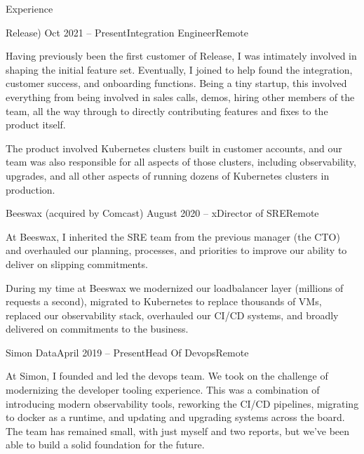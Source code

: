 \documentclass{resume} %
\begin{document}

\begin{rSection}{Experience}

\begin{rSubsection}{Release) }{Oct 2021 -- Present}{Integration Engineer}{Remote}

\item[]  Having previously been the first customer of Release, I was intimately involved in shaping
the initial feature set.  Eventually, I joined to help found the integration, customer success, and onboarding functions.  Being a tiny startup, this involved everything from
being involved in sales calls, demos, hiring other members of the team, all the way through to
directly contributing features and fixes to the product itself.

The product involved Kubernetes clusters built in customer accounts, and our team was also
responsible for all aspects of those clusters, including observability, upgrades, and all other aspects of
running dozens of Kubernetes clusters in production.

\end{rSubsection}


\begin{rSubsection}{Beeswax (acquired by Comcast) }{August 2020 -- x}{Director of SRE}{Remote}

\item[]  At Beeswax, I inherited the SRE team from the previous manager (the CTO) and overhauled our planning, processes, and priorities to improve our ability to deliver on slipping commitments.

During my time at Beeswax we modernized our loadbalancer layer (millions of requests a second), migrated to Kubernetes to replace thousands of VMs, replaced our observability stack, overhauled our CI/CD systems, and broadly delivered on commitments to the business.

\end{rSubsection}

\begin{rSubsection}{Simon Data}{April 2019 -- Present}{Head Of Devops}{Remote}

\item[] At Simon, I founded and led the devops team.  We took on the challenge of modernizing the developer tooling experience.  This was a combination of introducing modern observability tools, reworking the CI/CD pipelines, migrating to docker as a runtime, and updating and upgrading systems across the board.  The team has remained small, with just myself and two reports, but we've been able to build a solid foundation for the future.


\end{rSubsection}
\end{rSection}
\end{document}

